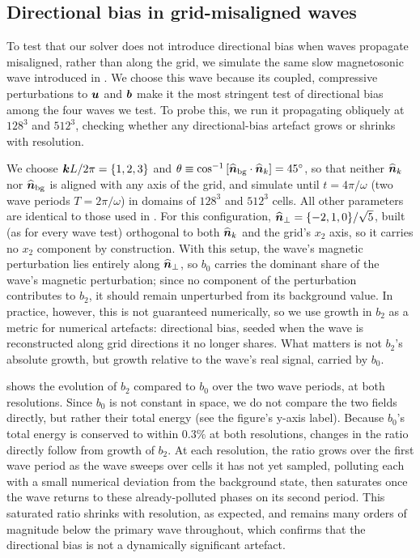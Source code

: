 \subsection{Directional bias in grid-misaligned waves}
\label{sec:stress-tests:misaligned-waves}

To test that our solver does not introduce directional bias when waves propagate misaligned, rather than along the grid, we simulate the same slow magnetosonic wave introduced in . We choose this wave because its coupled, compressive perturbations to $\bm{u}$ and $\bm{b}$ make it the most stringent test of directional bias among the four waves we test. To probe this, we run it propagating obliquely at $128^3$ and $512^3$, checking whether any directional-bias artefact grows or shrinks with resolution.

We choose $\bm{k}L/2\pi = \{1, 2, 3\}$ and $\theta \equiv \cos^{-1}\left[ \widehat{\bm{n}}_\mathrm{bg}\cdot\widehat{\bm{n}}_k \right] = 45^\circ$, so that neither $\widehat{\bm{n}}_k$ nor $\widehat{\bm{n}}_\mathrm{bg}$ is aligned with any axis of the grid, and simulate until $t = 4\pi/\omega$ (\ie two wave periods $T = 2\pi/\omega$) in domains of $128^3$ and $512^3$ cells. All other parameters are identical to those used in . For this configuration, $\widehat{\bm{n}}_\perp = \{-2,1,0\}/\sqrt{5}$, built (as for every wave test) orthogonal to both $\widehat{\bm{n}}_k$ and the grid's $x_2$ axis, so it carries no $x_2$ component by construction. With this setup, the wave's magnetic perturbation lies entirely along $\widehat{\bm{n}}_\perp$, so $b_0$ carries the dominant share of the wave's magnetic perturbation; since no component of the perturbation contributes to $b_2$, it should remain unperturbed from its background value. In practice, however, this is not guaranteed numerically, so we use growth in $b_2$ as a metric for numerical artefacts: directional bias, seeded when the wave is reconstructed along grid directions it no longer shares. What matters is not $b_2$'s absolute growth, but growth relative to the wave's real signal, carried by $b_0$.

 shows the evolution of $b_2$ compared to $b_0$ over the two wave periods, at both resolutions. Since $b_0$ is not constant in space, we do not compare the two fields directly, but rather their total energy (see the figure's y-axis label). Because $b_0$'s total energy is conserved to within $0.3\%$ at both resolutions, changes in the ratio directly follow from growth of $b_2$. At each resolution, the ratio grows over the first wave period as the wave sweeps over cells it has not yet sampled, polluting each with a small numerical deviation from the background state, then saturates once the wave returns to these already-polluted phases on its second period. This saturated ratio shrinks with resolution, as expected, and remains many orders of magnitude below the primary wave throughout, which confirms that the directional bias is not a dynamically significant artefact.

